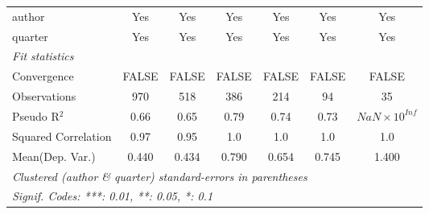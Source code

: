 \begin{tabular}{lcccccc}
   author                                                     & Yes           & Yes           & Yes           & Yes          & Yes             & Yes\\  
   quarter                                                    & Yes           & Yes           & Yes           & Yes          & Yes             & Yes\\  
   \midrule
   \emph{Fit statistics}\\
   Convergence                                                &FALSE          & FALSE         & FALSE         & FALSE        & FALSE           & FALSE\\  
   Observations                                               & 970           & 518           & 386           & 214          & 94              & 35\\  
   Pseudo R$^2$                                               & 0.66          & 0.65          & 0.79          & 0.74         & 0.73            & $NaN\times 10^{Inf}$\\   
   Squared Correlation                                        & 0.97          & 0.95          & 1.0           & 1.0          & 1.0             & 1.0\\  
Mean(Dep. Var.) & 0.440 & 0.434 & 0.790 & 0.654 & 0.745 & 1.400 \\
   \midrule \midrule
   \multicolumn{7}{l}{\emph{Clustered (author \& quarter) standard-errors in parentheses}}\\
   \multicolumn{7}{l}{\emph{Signif. Codes: ***: 0.01, **: 0.05, *: 0.1}}\\
\end{tabular}
\par\endgroup
